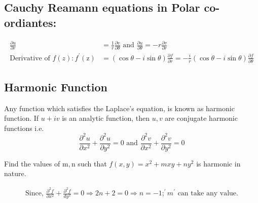 \begin{note}
	\subsection{Cauchy Reamann equations in Polar co-ordiantes:}
	\begin{answer}
		\begin{align*}
		\frac{\partial u}{\partial r}&=\frac{1}{r} \frac{\partial v}{\partial \theta} \text { and } \frac{\partial u}{\partial \theta}=-r \frac{\partial v}{\partial r}\\
		\text{Derivative of }f(z): f^{\prime}(\mathrm{z})&=(\cos \theta-i \sin \theta) \frac{\partial f}{\partial r}=-\frac{i}{r}(\cos \theta-i \sin \theta) \frac{\partial f}{\partial \theta}
		\end{align*}
	\end{answer}
	\subsection{Harmonic Function}
	Any function which satisfies the Laplace's equation, is known as harmonic function. If $u+i v$ is an analytic function, then $u, v$ are conjugate harmonic functions i.e.
	$$
	\frac{\partial^{2} u}{\partial x^{2}}+\frac{\partial^{2} u}{\partial y^{2}}=0 \text { and } \frac{\partial^{2} v}{\partial x^{2}}+\frac{\partial^{2} v}{\partial y^{2}}=0
	$$
	\begin{exercise}
		Find the values of $\mathrm{m}, \mathrm{n}$ such that $f(x, y)=x^{2}+m x y+n y^{2}$ is harmonic in nature.
	\end{exercise}
	\begin{answer}
		\begin{align*}
		\text { Since, } \frac{\partial^{2} f}{\partial x^{2}}+\frac{\partial^{2} f}{d y^{2}}=0 \Rightarrow 2 n+2=0 \Rightarrow n=-1 ;^{\prime} m^{\prime} \text { can take any value. }
		\end{align*}
	\end{answer}

\end{note}

